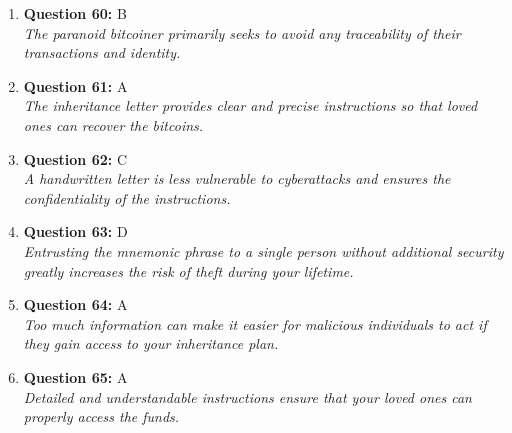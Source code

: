 \documentclass[12pt,a4paper]{article}
\begin{document}
\begin{enumerate}
\item \textbf{Question 60:} B
\\ \textit{The paranoid bitcoiner primarily seeks to avoid any traceability of their transactions and identity.}

\item \textbf{Question 61:} A
\\ \textit{The inheritance letter provides clear and precise instructions so that loved ones can recover the bitcoins.}

\item \textbf{Question 62:} C
\\ \textit{A handwritten letter is less vulnerable to cyberattacks and ensures the confidentiality of the instructions.}

\item \textbf{Question 63:} D
\\ \textit{Entrusting the mnemonic phrase to a single person without additional security greatly increases the risk of theft during your lifetime.}

\item \textbf{Question 64:} A
\\ \textit{Too much information can make it easier for malicious individuals to act if they gain access to your inheritance plan.}

\item \textbf{Question 65:} A
\\ \textit{Detailed and understandable instructions ensure that your loved ones can properly access the funds.}


\end{enumerate}
\end{document}

